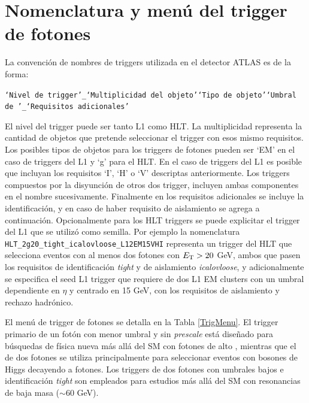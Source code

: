 \section{Nomenclatura y menú del trigger de fotones}


La convención de nombres de triggers utilizada en el detector ATLAS es de la forma:

{\footnotesize \texttt{`Nivel de trigger'\_`Multiplicidad del objeto'`Tipo de objeto'`Umbral de \ET'\_`Requisitos adicionales'}}


El nivel del trigger puede ser tanto L1 como HLT. La multiplicidad representa la cantidad de objetos que pretende seleccionar el trigger con esos mismo requisitos. Los posibles tipos de objetos para los triggers de fotones pueden ser `EM' en el caso de triggers del L1 y `g' para el HLT. En el caso de triggers del L1 es posible que incluyan los requisitos `I', `H' o `V' descriptas anteriormente. Los triggers compuestos por la disyunción de otros dos trigger, incluyen ambas componentes en el nombre sucesivamente. Finalmente en los requisitos adicionales se incluye la identificación, y en caso de haber requisito de aislamiento se agrega a continuación. Opcionalmente para los HLT triggers se puede explicitar el trigger del L1 que se utilizó como semilla. Por ejemplo la nomenclatura \texttt{HLT\_2g20\_tight\_icalovloose\_L12EM15VHI} representa un trigger del HLT que selecciona eventos con al menos dos fotones con $E_{\text{T}}>20$ GeV, ambos que pasen los requisitos de identificación \textit{tight} y de aislamiento \textit{icalovloose}, y adicionalmente se especifica el seed L1 trigger que requiere de dos L1 EM clusters con un umbral dependiente en $\eta$ y centrado en 15 GeV, con los requisitos de aislamiento y rechazo hadrónico.

El menú de trigger de fotones se detalla en la Tabla \ref{TrigMenu}. El trigger primario de un fotón con menor umbral y sin \textit{prescale} está diseñado para búsquedas de física nueva más allá del SM con fotones de alto \ET, mientras que el de dos fotones se utiliza principalmente para seleccionar eventos con bosones de Higgs decayendo a fotones. Los triggers de dos fotones con umbrales bajos e identificación \textit{tight} son empleados para estudios más allá del SM con resonancias de baja masa ($\sim60$ GeV).



